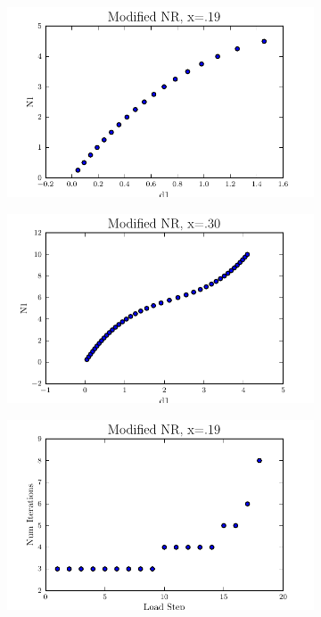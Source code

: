 \documentclass[10pt,letterpaper]{article}
\begin{document}
\begin{figure}[!tbh]
  \begin{subfigure}[b]{.6\textwidth}
    \includegraphics[width=\textwidth]{moded_nr_x19.pdf}
    \caption{}
    \label{fig3:label:a}
  \end{subfigure}
  \hfill
  \begin{subfigure}[b]{.6\textwidth}
    \includegraphics[width=\textwidth]{moded_nr_x30.pdf}
    \caption{}
    \label{fig3:label:b}
  \end{subfigure}
  \hfill
    \begin{subfigure}[b]{.6\textwidth}
    \includegraphics[width=\textwidth]{moded_nr_x19_conv.pdf}

\end{subfigure}
\end{figure}
\end{document}
